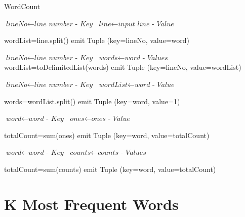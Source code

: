 \documentclass[journal,10pt]{IEEEtran}
\begin{document}
\begin{algorithm}
\caption{WordCount}\label{euclid}
\begin{algorithmic}[1]





\State $\textit{lineNo} \gets \textit{line number - Key} $
\State $\textit{line} \gets \textit{input line - Value }$



\State wordList=line.split()
\State emit Tuple (key=lineNo, value=word)
\EndIf
\EndFor
\EndProcedure


\State $\textit{lineNo} \gets \textit{line number - Key} $
\State $\textit{words} \gets \textit{word - Values}$
\State wordList=toDelimitedList(words)
\State emit Tuple (key=lineNo, value=wordList)
\EndProcedure

\State $\textit{lineNo} \gets \textit{line number - Key} $
\State $\textit{wordList} \gets \textit{word - Value}$

\State words=wordList.split()
\State emit Tuple (key=word, value=1)
\EndFor
\EndProcedure

\State $\textit{word} \gets \textit{word - Key} $
\State $\textit{ones} \gets \textit{ones - Value}$

\State totalCount=sum(ones)
\State emit Tuple (key=word, value=totalCount)
\EndProcedure


\State $\textit{word} \gets \textit{word - Key} $
\State $\textit{counts} \gets \textit{counts - Values}$

\State totalCount=sum(counts)
\State emit Tuple (key=word, value=totalCount)

\EndProcedure


\end{algorithmic}
\end{algorithm}
\clearpage
\section*{K Most Frequent Words}
\end{document}
